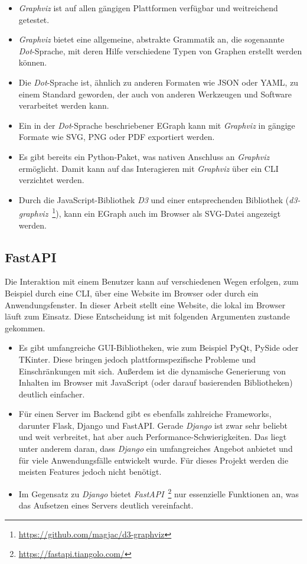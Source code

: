 \begin{itemize}
    \item \textit{Graphviz} ist auf allen gängigen Plattformen verfügbar und weitreichend getestet.
    \item \textit{Graphviz} bietet eine allgemeine, abstrakte Grammatik an, die sogenannte \textit{Dot}-Sprache, mit deren Hilfe verschiedene Typen von Graphen erstellt werden können.
    \item Die \textit{Dot}-Sprache ist, ähnlich zu anderen Formaten wie JSON oder YAML, zu einem Standard geworden, der auch von anderen Werkzeugen und Software verarbeitet werden kann.
    \item Ein in der \textit{Dot}-Sprache beschriebener EGraph kann mit \textit{Graphviz} in gängige Formate wie SVG, PNG oder PDF exportiert werden.
    \item Es gibt bereits ein Python-Paket, was nativen Anschluss an \textit{Graphviz} ermöglicht. Damit kann auf das Interagieren mit \textit{Graphviz} über ein CLI verzichtet werden.
    \item Durch die JavaScript-Bibliothek \textit{D3} und einer entsprechenden Bibliothek (\textit{d3-graphviz}~\footnote{\hspace{1.5mm}\url{https://github.com/magjac/d3-graphviz}}), kann ein EGraph auch im Browser als SVG-Datei angezeigt werden.
\end{itemize}

\subsection{FastAPI}

Die Interaktion mit einem Benutzer kann auf verschiedenen Wegen erfolgen, zum Beispiel durch eine CLI, über eine Website im Browser oder durch ein Anwendungsfenster.
In dieser Arbeit stellt eine Website, die lokal im Browser läuft zum Einsatz. Diese Entscheidung ist mit folgenden Argumenten zustande gekommen. 

\begin{itemize}
    \item Es gibt umfangreiche GUI-Bibliotheken, wie zum Beispiel PyQt, PySide oder TKinter. Diese bringen jedoch plattformspezifische Probleme und Einschränkungen mit sich.
    Außerdem ist die dynamische Generierung von Inhalten im Browser mit JavaScript (oder darauf basierenden Bibliotheken) deutlich einfacher.
    \item Für einen Server im Backend gibt es ebenfalls zahlreiche Frameworks, darunter Flask, Django und FastAPI.
    Gerade \textit{Django} ist zwar sehr beliebt und weit verbreitet, hat aber auch Performance-Schwierigkeiten.
    Das liegt unter anderem daran, dass \textit{Django} ein umfangreiches Angebot anbietet und für viele Anwendungsfälle entwickelt wurde.
    Für dieses Projekt werden die meisten Features jedoch nicht benötigt.
    \item Im Gegensatz zu \textit{Django} bietet \textit{FastAPI}~\footnote{\hspace{1.5mm}\url{https://fastapi.tiangolo.com/}} nur essenzielle Funktionen an, was das Aufsetzen eines Servers deutlich vereinfacht.
\end{itemize}

